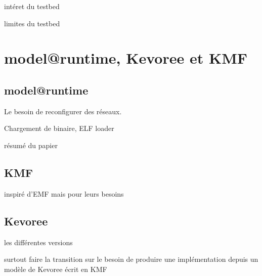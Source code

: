 intéret du testbed

limites du testbed

\section{model@runtime, Kevoree et KMF}

\subsection{model@runtime}

Le besoin de reconfigurer des réseaux.

Chargement de binaire, ELF loader

résumé du papier

\subsection{KMF}

inspiré d'EMF mais pour leurs besoins

\subsection{Kevoree}

les différentes versions

surtout faire la transition sur le besoin de produire une implémentation depuis un modèle de Kevoree écrit en KMF